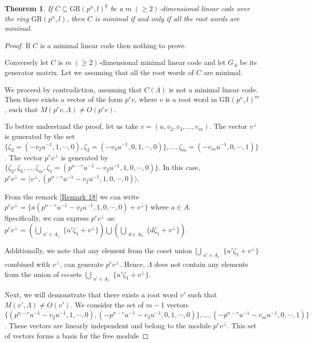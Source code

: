 \documentclass[10pt]{article}
\newtheorem{theorem}[lem]{Theorem}
\theoremstyle{definition}
\begin{document}
\begin{theorem}\label{Theorem 8}
If $C\subseteq \mathrm{GR}(p^n,l)^k$ be a $m \; (\geq 2)$-dimensional linear code over the ring $\mathrm{GR}(p^n,l)$, then $C$ is minimal if and only if all the root words are minimal.
\end{theorem}
\begin{proof}
If $C$ is a minimal linear code then nothing to prove.

Conversely let $C$ is $m \; (\geq 2)$-dimensional minimal linear code and let $G_\Lambda$ be its generator matrix. Let we assuming that all the root words of $C$ are minimal.

We proceed by contradiction, assuming that $C(\Lambda)$ is not a minimal linear code. Then there exists a vector of the form $p^r v$, where $v$ is a root word in $\mathrm{GR}(p^n,l)^m$, such that $M(p^r v, \Lambda) \neq O(p^r v)$.

To better understand the proof, let us take $v = (u, v_2, v_3, \ldots, v_m)$. The vector $v^\perp$ is generated by the set $\{ \zeta_2= (-v_2u^{-1},1,\cdots,0),\zeta_3=(-v_3u^{-1},0,1,\cdots,0)\},\ldots,\zeta_m=(-v_mu^{-1},0,\cdots,1)\}$. The vector $p^r v^\perp$ is generated by \\ $\{\zeta_2,\zeta_3,\ldots,\zeta_m, \zeta_1=(p^{n-r}u^{-1}-v_2u^{-1},1,0,\cdots,0)\}$. In this case, $p^r v^\perp = \langle v^\perp, (p^{n-r}u^{-1}-v_2u^{-1},1,0,\cdots,0) \rangle$.

From the remark \ref{Remark 18} we can write $p^r v^\perp=\{a(p^{n-r}u^{-1}-v_2u^{-1},1,0,\cdots,0)+v^\perp\}$ where $a\in A$. \\Specifically, we can express $p^r v^\perp$ as:
$p^r v^\perp = \left(\bigcup_{\substack{u' \in A_1}} \{u'\zeta_1 + v^\perp\}\right) \bigcup \left(\bigcup_{\substack{d \in A_0}} \{d\zeta_1 + v^\perp\}\right)$.

Additionally, we note that any element from the coset union $\bigcup_{\substack{u' \in A_1}} \{u'\zeta_1 + v^\perp\}$ combined with $v^\perp$, can generate $p^r v^\perp$. Hence, $\Lambda$ does not contain any elements from the union of co-sets $\bigcup_{\substack{u' \in A_1}} \{u'\zeta_1 + v^\perp\}$.

Next, we will demonstrate that there exists a root word $v'$ such that $M(v', \Lambda) \neq O(v')$. We consider the set of $m-1$ vectors
$\{ (p^{n-r}u^{-1}-v_2u^{-1},1,\cdots,0),(-p^{n-r}u^{-1}-v_3u^{-1},0,1,\cdots,0)\},\ldots,(-p^{n-r}u^{-1}-v_mu^{-1},0,\cdots,1)\}$. These vectors are linearly independent and belong to the module $p^r v^\perp$. This set of vectors forms a basis for the free module


\end{proof}
\end{document}

